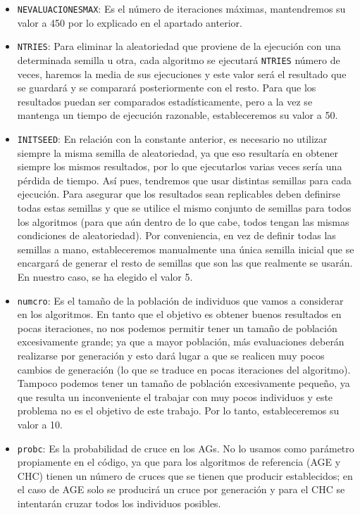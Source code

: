 \begin{itemize}
	\item \texttt{NEVALUACIONESMAX}: Es el número de iteraciones máximas, mantendremos su valor a 450 por lo explicado en el apartado anterior. 
	\item \texttt{NTRIES}: Para eliminar la aleatoriedad que proviene de la ejecución con una determinada semilla u otra, cada algoritmo se ejecutará \texttt{NTRIES} número de veces, haremos la media de sus ejecuciones y este valor será el resultado que se guardará y se comparará posteriormente con el resto. 
	Para que los resultados puedan ser comparados estadísticamente, pero a la vez se mantenga un tiempo de ejecución razonable, estableceremos su valor a 50.
	\item \texttt{INITSEED}: En relación con la constante anterior, es necesario no utilizar siempre la misma semilla de aleatoriedad, ya que eso resultaría en obtener siempre los mismos resultados, por lo que ejecutarlos varias veces sería una pérdida de tiempo. 
	Así pues, tendremos que usar distintas semillas para cada ejecución. 
	Para asegurar que los resultados sean replicables deben definirse todas estas semillas y que se utilice el mismo conjunto de semillas para todos los algoritmos (para que aún dentro de lo que cabe, todos tengan las mismas condiciones de aleatoriedad). 
	Por conveniencia, en vez de definir todas las semillas a mano, estableceremos manualmente una única semilla inicial que se encargará de generar el resto de semillas que son las que realmente se usarán.
	En nuestro caso, se ha elegido el valor 5. 
	\item \texttt{numcro}: Es el tamaño de la población de individuos que vamos a considerar en los algoritmos. 
	En tanto que el objetivo es obtener buenos resultados en pocas iteraciones, no nos podemos permitir tener un tamaño de población excesivamente grande; ya que a mayor población, más evaluaciones deberán realizarse por generación y esto dará lugar a que se realicen muy pocos cambios de generación (lo que se traduce en pocas iteraciones del algoritmo). 
	Tampoco podemos tener un tamaño de población excesivamente pequeño, ya que resulta un inconveniente el trabajar con muy pocos individuos y este problema no es el objetivo de este trabajo. 
	Por lo tanto, estableceremos su valor a 10.
	\item \texttt{probc}: Es la probabilidad de cruce en los AGs. 
	No lo usamos como parámetro propiamente en el código, ya que para los algoritmos de referencia (AGE y CHC) tienen un número de cruces que se tienen que producir establecidos; en el caso de AGE solo se producirá un cruce por generación y para el CHC se intentarán cruzar todos los individuos posibles. 

\end{itemize}
